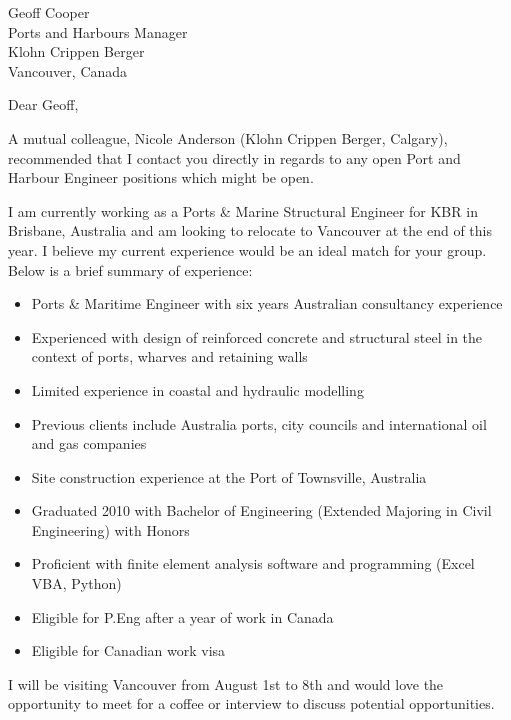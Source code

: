 \documentclass[paper=a4,fontsize=11pt,DIV=16, parskip=half,firstfoot=false]{scrlttr2}
\begin{document}
\begin{letter}{Geoff Cooper\\Ports and Harbours Manager\\Klohn Crippen Berger\\Vancouver, Canada}
\opening{Dear Geoff,}

A mutual colleague, Nicole Anderson (Klohn Crippen Berger, Calgary), recommended that I contact you directly in regards to any open Port and Harbour Engineer positions which might be open.

I am currently working as a Ports \& Marine Structural Engineer for KBR in Brisbane, Australia and am looking to relocate to Vancouver at the end of this year. I believe my current experience would be an ideal match for your group. Below is a brief summary of experience:

\begin{itemize}
\item Ports \& Maritime Engineer with six years Australian consultancy experience
\item Experienced with design of reinforced concrete and structural steel in the context of ports, wharves and retaining walls
\item Limited experience in coastal and hydraulic modelling
\item Previous clients include Australia ports, city councils and international oil and gas companies
\item Site construction experience at the Port of Townsville, Australia
\item Graduated 2010 with Bachelor of Engineering (Extended Majoring in Civil Engineering) with Honors
\item Proficient with finite element analysis software and programming (Excel VBA, Python)
\item Eligible for P.Eng after a year of work in Canada
\item Eligible for Canadian work visa
\end{itemize}

I will be visiting Vancouver from August 1st to 8th and would love the opportunity to meet for a coffee or interview to discuss potential opportunities.




\end{letter}
\end{document}
